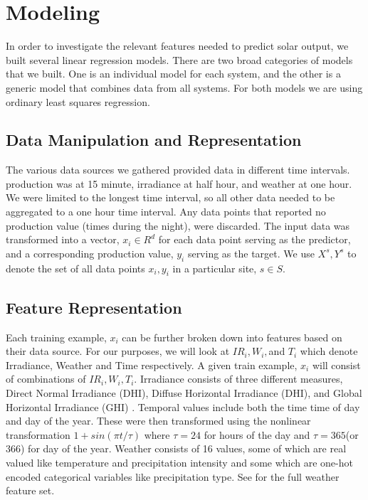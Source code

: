 \documentclass[11pt, fullpage,letterpaper]{article}
\begin{document}
\section{Modeling}

In order to investigate the relevant features needed to predict solar output, we built several linear regression models. There are two broad categories of models that we built. One is an individual model for each system, and the other is a generic model that combines data from all systems. For both models we are using ordinary least squares regression. 

\subsection{Data Manipulation and Representation}

The various data sources we gathered provided data in different time intervals. production was at 15 minute, irradiance at half hour, and weather at one hour. We were limited to the longest time interval, so all other data needed to be aggregated to a one hour time interval. Any data points that reported no production value (times during the night), were discarded. The input data was transformed into a vector, $x_i \in R^d$ for each data point serving as the predictor, and a corresponding production value, $y_i$ serving as the target. We use $X^s, Y^s$ to denote the set of all data points $x_i,y_i$ in a particular site, $s \in S$.

\subsection{Feature Representation}

Each training example, $x_i$ can be further broken down into features based on their data source. For our purposes, we will look at $IR_i,W_i,$and $T_i$ which denote Irradiance, Weather and Time respectively. A given train example, $x_i$ will consist of combinations of $IR_i, W_i, T_i$. Irradiance consists of three different measures, Direct Normal Irradiance (DHI), Diffuse Horizontal Irradiance (DHI), and Global Horizontal Irradiance (GHI) \cite{irradiance}. Temporal values include both the time time of day and day of the year. These were then transformed using the nonlinear transformation $1 + sin( \pi t / \tau )$ where $\tau=24$ for hours of the day and $\tau=365$(or $366$) for day of the year. Weather consists of 16 values, some of which are real valued like temperature and precipitation intensity and some which are one-hot encoded categorical variables like precipitation type. See \cite{DarkSky} for the full weather feature set.
\end{document}
